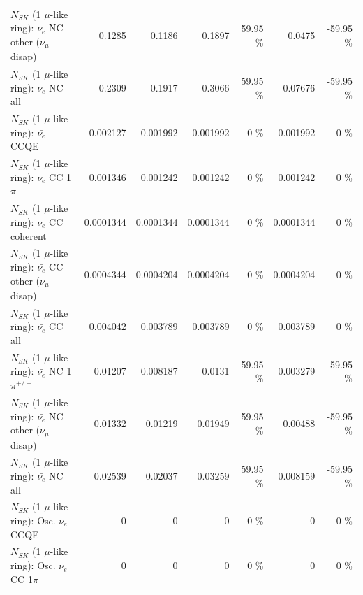 \begin{table}
\begin{tabular}{| l | r | r | r  r | r  r |}
                $N_{SK}$ (1 $\mu$-like ring): $\nu_e$ NC other ($\nu_\mu$ disap) &          0.1285 &          0.1186 &          0.1897 &    59.95 \%  &          0.0475 &   -59.95 \%  \\ 
                                  $N_{SK}$ (1 $\mu$-like ring): $\nu_{e}$ NC all &          0.2309 &          0.1917 &          0.3066 &    59.95 \%  &         0.07676 &   -59.95 \%  \\ 
\hline
\hline
\hline
                                $N_{SK}$ (1 $\mu$-like ring): $\bar{\nu_e}$ CCQE &        0.002127 &        0.001992 &        0.001992 &        0 \%  &        0.001992 &        0 \%  \\ 
                           $N_{SK}$ (1 $\mu$-like ring): $\bar{\nu_e}$ CC 1$\pi$ &        0.001346 &        0.001242 &        0.001242 &        0 \%  &        0.001242 &        0 \%  \\ 
                         $N_{SK}$ (1 $\mu$-like ring): $\bar{\nu_e}$ CC coherent &       0.0001344 &       0.0001344 &       0.0001344 &        0 \%  &       0.0001344 &        0 \%  \\ 
          $N_{SK}$ (1 $\mu$-like ring): $\bar{\nu_e}$ CC other ($\nu_\mu$ disap) &       0.0004344 &       0.0004204 &       0.0004204 &        0 \%  &       0.0004204 &        0 \%  \\ 
                            $N_{SK}$ (1 $\mu$-like ring): $\bar{\nu_{e}}$ CC all &        0.004042 &        0.003789 &        0.003789 &        0 \%  &        0.003789 &        0 \%  \\ 
\hline
                     $N_{SK}$ (1 $\mu$-like ring): $\bar{\nu_e}$ NC 1$\pi^{+/-}$ &         0.01207 &        0.008187 &          0.0131 &    59.95 \%  &        0.003279 &   -59.95 \%  \\ 
          $N_{SK}$ (1 $\mu$-like ring): $\bar{\nu_e}$ NC other ($\nu_\mu$ disap) &         0.01332 &         0.01219 &         0.01949 &    59.95 \%  &         0.00488 &   -59.95 \%  \\ 
                            $N_{SK}$ (1 $\mu$-like ring): $\bar{\nu_{e}}$ NC all &         0.02539 &         0.02037 &         0.03259 &    59.95 \%  &        0.008159 &   -59.95 \%  \\ 
\hline
\hline
\hline
                                 $N_{SK}$ (1 $\mu$-like ring): Osc. $\nu_e$ CCQE &               0 &               0 &               0 &        0 \%  &               0 &        0 \%  \\ 
                            $N_{SK}$ (1 $\mu$-like ring): Osc. $\nu_e$ CC 1$\pi$ &               0 &               0 &               0 &        0 \%  &               0 &        0 \%  \\ 

\end{tabular}
\end{table}
